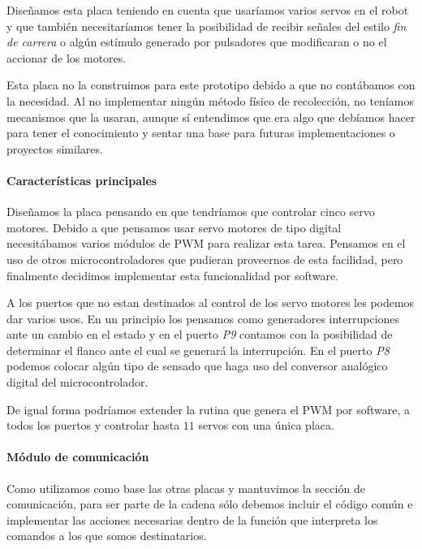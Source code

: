 Dise\~namos esta placa teniendo en cuenta que usar\'iamos varios servos en el robot y que tambi\'en
necesitar\'iamos tener la posibilidad de recibir se\~nales del estilo \emph{fin de carrera} o alg\'un
est\'imulo generado por pulsadores que modificaran o no el accionar de los motores.

Esta placa no la construimos para este prototipo debido a que no cont\'abamos con la necesidad.
Al no implementar ning\'un m\'etodo f\'isico de recolecci\'on, no ten\'iamos mecanismos que la
usaran, aunque s\'i entendimos que era algo que deb\'iamos hacer para tener el conocimiento y sentar
una base para futuras implementaciones o proyectos similares.

\paragraph{Caracter\'isticas principales}
\label{h_placas_servos_caracteristicas}

Dise\~namos la placa pensando en que tendr\'iamos que controlar cinco servo motores.
Debido a que pensamos usar servo motores de tipo digital necesit\'abamos varios m\'odulos de PWM para
realizar esta tarea.
Pensamos en el uso de otros microcontroladores que pudieran proveernos de esta facilidad, pero finalmente
decidimos implementar esta funcionalidad por software.

A los puertos que no estan destinados al control de los servo motores les podemos dar varios usos.
En un principio los pensamos como generadores interrupciones ante un cambio en el estado y en el
puerto \emph{P9} contamos con la posibilidad de determinar el flanco ante el cual se generar\'a la
interrupci\'on.
En el puerto \emph{P8} podemos colocar alg\'un tipo de sensado que haga uso del conversor anal\'ogico
digital del microcontrolador.

De igual forma podr\'iamos extender la rutina que genera el PWM por software, a todos los puertos y
controlar hasta $11$ servos con una \'unica placa.

\paragraph{M\'odulo de comunicaci\'on}
\label{h_placas_servos_comm}

Como utilizamos como base las otras placas y mantuvimos la secci\'on de comunicaci\'on, para ser parte
de la cadena s\'olo debemos incluir el c\'odigo com\'un e implementar las acciones necesarias dentro
de la funci\'on que interpreta los comandos a los que somos destinatarios.

